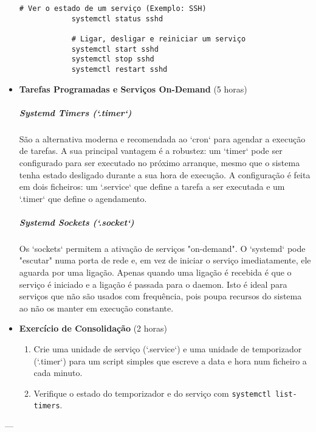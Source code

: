 \documentclass[10pt,a4paper]{article}
\begin{document}
\begin{itemize}
		\begin{lstlisting}[caption=Comandos de gestão de serviços]
			# Ver o estado de um serviço (Exemplo: SSH)
			systemctl status sshd
			
			# Ligar, desligar e reiniciar um serviço
			systemctl start sshd
			systemctl stop sshd
			systemctl restart sshd
		\end{lstlisting}
		
		\item \textbf{Tarefas Programadas e Serviços On-Demand} (5 horas)
		\subparagraph{Systemd Timers (`.timer`)} São a alternativa moderna e recomendada ao `cron` para agendar a execução de tarefas. A sua principal vantagem é a robustez: um `timer` pode ser configurado para ser executado no próximo arranque, mesmo que o sistema tenha estado desligado durante a sua hora de execução. A configuração é feita em dois ficheiros: um `.service` que define a tarefa a ser executada e um `.timer` que define o agendamento.
		\subparagraph{Systemd Sockets (`.socket`)} Os `sockets` permitem a ativação de serviços "on-demand". O `systemd` pode "escutar" numa porta de rede e, em vez de iniciar o serviço imediatamente, ele aguarda por uma ligação. Apenas quando uma ligação é recebida é que o serviço é iniciado e a ligação é passada para o daemon. Isto é ideal para serviços que não são usados com frequência, pois poupa recursos do sistema ao não os manter em execução constante.
		
		\item \textbf{Exercício de Consolidação} (2 horas)
		\begin{enumerate}
			\item Crie uma unidade de serviço (`.service`) e uma unidade de temporizador (`.timer`) para um script simples que escreve a data e hora num ficheiro a cada minuto.
			\item Verifique o estado do temporizador e do serviço com \texttt{systemctl list-timers}.
		\end{enumerate}
	\end{itemize}
	
	---
	
\end{document}
